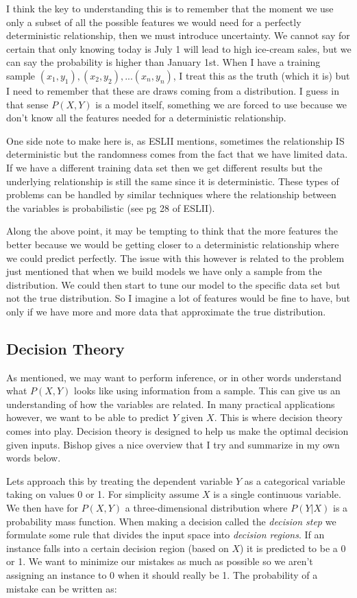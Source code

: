 I think the key to understanding this is to remember that the moment we use only a subset of all the possible features we would need for a perfectly deterministic relationship, then we must introduce uncertainty. We cannot say for certain that only knowing today is July 1 will lead to high ice-cream sales, but we can say the probability is higher than January 1st. When I have a training sample $(x_1, y_1), (x_2, y_2), ... (x_n, y_n)$,  I treat this as the truth (which it is) but I need to remember that these are draws coming from a distribution. I guess in that sense $P(X,Y)$ is a model itself, something we are forced to use because we don't know all the features needed for a deterministic relationship. 

One side note to make here is, as ESLII mentions, sometimes the relationship IS deterministic but the randomness comes from the fact that we have limited data. If we have a different training data set then we get different results but the underlying relationship is still the same since it is deterministic. These types of problems can be handled by similar techniques where the relationship between the variables is probabilistic (see pg 28 of ESLII).

Along the above point, it may be tempting to think that the more features the better because we would be getting closer to a deterministic relationship where we could predict perfectly. The issue with this however is related to the problem just mentioned that when we build models we have only a sample from the distribution. We could then start to tune our model to the specific data set but not the true distribution. So I imagine a lot of features would be fine to have, but only if we have more and more data that approximate the true distribution.

\subsection{Decision Theory}
As mentioned, we may want to perform inference, or in other words understand what $P(X,Y)$ looks like using information from a sample.  This can give us an understanding of how the variables are related. In many practical applications however, we want to be able to predict $Y$ given $X$. This is where decision theory comes into play. Decision theory is designed to help us make the optimal decision given inputs. Bishop gives a nice overview that I try and summarize in my own words below.

Lets approach this by treating the dependent variable $Y$ as a categorical variable taking on values 0 or 1. For simplicity assume $X$ is a single continuous variable. We then have for $P(X,Y)$ a three-dimensional distribution where $P(Y|X)$ is a probability mass function. When making a decision called the \emph{decision step} we formulate some rule that divides the input space into \emph{decision regions}. If an instance falls into a certain decision region (based on $X$) it is predicted to be a 0 or 1. We want to minimize our mistakes as much as possible so we aren't assigning an instance to 0 when it should really be 1. The probability of a mistake can be written as:

